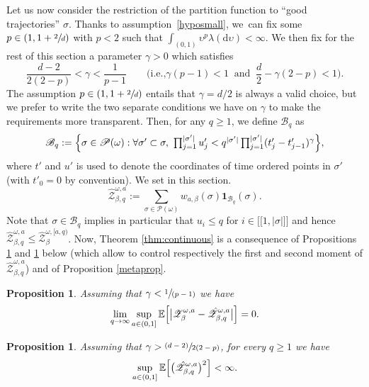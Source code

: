 \documentclass[11pt]{article}
\newcommand{\ie}{i.e.,\xspace}
\numberwithin{equation}{section}
\let\mathcal\mathscr
\let\sep:
\newcommand{\psfrac}[2]{\sfrac{(#1)}{#2}}
\newcommand{\spfrac}[2]{\sfrac{#1}{(#2)}}
\newcommand{\lint}{\mathopen{[\![}}
\newcommand{\rint}{\mathclose{]\!]}}
\newtheorem{proposition}[theorem]{Proposition}
\theoremstyle{definition}
\newcommand{\dd}{\mathrm{d}}
\newcommand{\ind}{\mathbf{1}}
\newcommand{\cB}{{\ensuremath{\mathcal B}} }
\newcommand{\cP}{{\ensuremath{\mathcal P}} }
\newcommand{\cZ}{{\ensuremath{\mathcal Z}} }
\newcommand{\bbE}{{\ensuremath{\mathbb E}} }
\let\ups\upsilon
\let\go\omega
\begin{document}
Let us now consider the restriction of the partition function to ``good trajectories'' $\sigma$.
Thanks to assumption~\eqref{hyposmall}, we~can fix some $p\in (1,1+\sfrac 2d)$ with $p<2$ such that $\int_{(0,1)} \ups^{p} \lambda(\dd \ups)<\infty$.
We then fix for the rest of this section a parameter $\gamma>0$ which satisfies
\begin{equation}
\label{lesdeuxconds}
\frac{d-2}{2(2-p)} < \gamma < \frac{1}{p-1} \qquad \bigl(\text{\ie}\gamma(p-1)<1 \ \text{ and } \ \frac d2 -\gamma(2-p) <1 \bigr).
\end{equation}
The assumption $p \in (1, 1+\sfrac 2d)$ entails that $\gamma=d/2$ is always a valid choice, but
we prefer to write the two separate conditions we have on $\gamma$ to make the requirements more transparent.
Then, for any $q \geq 1$, we define $ \cB_q$ as
\begin{equation}
\label{def:BNcont}\textstyle
\cB_q :=\Bigl\{ \sigma \in \cP(\go) \sep \forall \sigma'\subset \sigma, \ \prod_{j=1}^{|\sigma'|} u'_j < q^{|\sigma'|} \prod_{j=1}^{|\sigma'|} (t_j'-t_{j-1}')^{\gamma} \Bigr\},
\end{equation}
where $t'$ and $u'$ is used to denote the coordinates of time ordered points in $\sigma'$ (with $t'_0=0$ by convention).
We set in this section.
\begin{equation}
\hat \cZ^{\go,a}_{\beta,q}:= \sum_{\sigma \in \cP(\go)} w_{a,\beta}(\sigma) \ind_{ \cB_q}(\sigma).
\end{equation}
Note that $\sigma\in \cB_q$ implies in particular that $u_i\le q$ for $i\in \lint 1, |\sigma| \rint$ and hence $\hat \cZ^{\go,a}_{\beta,q}\le \hat \cZ^{\go,[a,q)}_{\beta}$.
Now, Theorem \ref{thm:continuous} is a consequence of Propositions \ref{lesper} and \ref{llavar} below (which allow to control respectively the first and second moment of $\hat \cZ^{\go,a}_{\beta,q}$) and of Proposition \ref{metaprop}.

\begin{proposition}\label{lesper}
Assuming that $\gamma < \spfrac{1}{p-1}$ we have
\begin{equation}\label{unif1}
\lim_{q \to \infty} \sup_{a\in(0,1]} \bbE \Bigl[ \big| \cZ^{\go,a}_{\beta}- \hat \cZ^{\go,a}_{\beta,q} \big| \Bigr]=0.
\end{equation}
\end{proposition}

\begin{proposition}\label{llavar}
Assuming that $\gamma>\psfrac{d-2}{2(2-p)}$,
for every $q\ge 1$ we have
\begin{equation}\label{unif2}
\sup_{a\in(0,1]} \bbE \Bigl[ \bigl(\hat \cZ^{\go,a}_{\beta,q} \bigr)^2 \Bigr]<\infty.
\end{equation}
\end{proposition}
\end{document}
